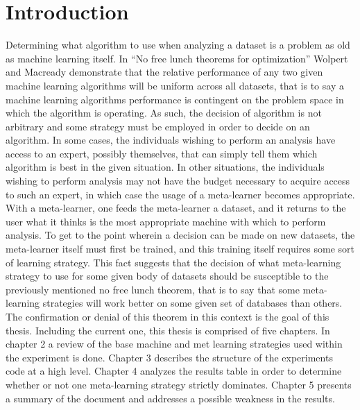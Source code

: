 \chapter{Introduction}
\label{Introduction}
Determining what algorithm to use when analyzing a dataset is a problem as
old as machine learning itself. In ``No free lunch theorems for optimization''
Wolpert and Macready demonstrate that the relative performance of any two given
machine learning algorithms will be uniform across all datasets, that is to say
a machine learning algorithms performance is contingent on the problem space in
which the algorithm is operating. As such, the decision of algorithm is not
arbitrary and some strategy must be employed in order to decide
on an algorithm. In some cases, the individuals wishing to perform an analysis
have access to an expert, possibly themselves, that can simply tell them which
algorithm is best in the given situation. In other situations, the individuals
wishing to perform analysis may not have the budget necessary to acquire access
to such an expert, in which case the usage of a meta-learner becomes appropriate.
With a meta-learner, one feeds the meta-learner a dataset, and it returns to the
user what it thinks is the most appropriate machine with which to perform
analysis. To get to the point wherein a decision can be made on new datasets, the
meta-learner itself must first be trained, and this training itself requires some
sort of learning strategy. This fact suggests that the decision of what
meta-learning strategy to use for some given body of datasets should be
susceptible to the previously mentioned no free lunch theorem, that is to say
that some meta-learning strategies will work better on some given set of
databases than others. The confirmation or denial of this theorem in this
context is the goal of this thesis. Including the current one, this thesis is
comprised of five chapters. In chapter 2 a review of the base machine and met
learning strategies used within the experiment is done. Chapter 3 describes the
structure of the experiments code at a high level. Chapter 4 analyzes the
results table in order to determine whether or not one meta-learning strategy
strictly dominates. Chapter 5 presents a summary of the document and addresses a
possible weakness in the results.
